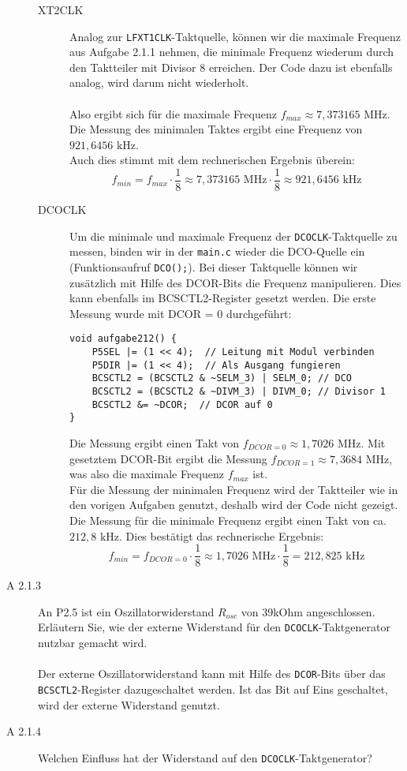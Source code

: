 \documentclass[11pt,a4paper,ngerman]{article}
\begin{document}
\begin{description}
\begin{description}
			\item[XT2CLK] Analog zur \texttt{LFXT1CLK}-Taktquelle, können wir die maximale Frequenz aus Aufgabe 2.1.1 nehmen, die minimale Frequenz wiederum durch den Taktteiler mit Divisor 8 erreichen. Der Code dazu ist ebenfalls analog, wird darum nicht wiederholt. \\ \\
			Also ergibt sich für die maximale Frequenz $f_{max} \approx 7,373165 \text{ MHz}$. \\
			Die Messung des minimalen Taktes ergibt eine Frequenz von $921,6456 \text{ kHz}$. \\
			Auch dies stimmt mit dem rechnerischen Ergebnis überein:
			$$ f_{min} = f_{max} \cdot \frac{1}{8} \approx 7,373165 \text{ MHz} \cdot \frac{1}{8} \approx 921,6456 \text{ kHz}$$
			\item[DCOCLK] Um die minimale und maximale Frequenz der \texttt{DCOCLK}-Taktquelle zu messen, binden wir in der \texttt{main.c} wieder die DCO-Quelle ein (Funktionsaufruf \texttt{DCO();}). Bei dieser Taktquelle können wir zusätzlich mit Hilfe des DCOR-Bits die Frequenz manipulieren. Dies kann ebenfalls im BCSCTL2-Register gesetzt werden. Die erste Messung wurde mit DCOR = 0 durchgeführt:
			\begin{lstlisting}
void aufgabe212() {
    P5SEL |= (1 << 4);	// Leitung mit Modul verbinden
    P5DIR |= (1 << 4);	// Als Ausgang fungieren
    BCSCTL2 = (BCSCTL2 & ~SELM_3) | SELM_0; // DCO
    BCSCTL2 = (BCSCTL2 & ~DIVM_3) | DIVM_0; // Divisor 1
    BCSCTL2 &= ~DCOR;  // DCOR auf 0
}
\end{lstlisting}
			Die Messung ergibt einen Takt von $ f_{DCOR = 0} \approx 1,7026 \text{ MHz} $.
			Mit gesetztem DCOR-Bit ergibt die Messung $ f_{DCOR = 1} \approx 7,3684 \text{ MHz} $, was also die maximale Frequenz $f_{max}$ ist. \\
			Für die Messung der minimalen Frequenz wird der Taktteiler wie in den vorigen Aufgaben genutzt, deshalb wird der Code nicht gezeigt. Die Messung für die minimale Frequenz ergibt einen Takt von ca. $212,8 \text{ kHz}$. Dies bestätigt das rechnerische Ergebnis:
			$$ f_{min} = f_{DCOR = 0} \cdot \frac{1}{8} \approx 1,7026 \text{ MHz} \cdot \frac{1}{8} = 212,825 \text{ kHz} $$
		\end{description}
		
	\item[A 2.1.3] An P2.5 ist ein Oszillatorwiderstand $R_{osc}$ von 39kOhm angeschlossen. Erläutern Sie, wie der externe Widerstand für den \texttt{DCOCLK}-Taktgenerator nutzbar gemacht wird. \\ \\
		
		Der externe Oszillatorwiderstand kann mit Hilfe des \texttt{DCOR}-Bits über das \texttt{BCSCTL2}-Register dazugeschaltet werden. Ist das Bit auf Eins geschaltet, wird der externe Widerstand genutzt.	
		
	\item[A 2.1.4] Welchen Einfluss hat der Widerstand auf den \texttt{DCOCLK}-Taktgenerator?  \\
	

\end{description}
\end{document}
